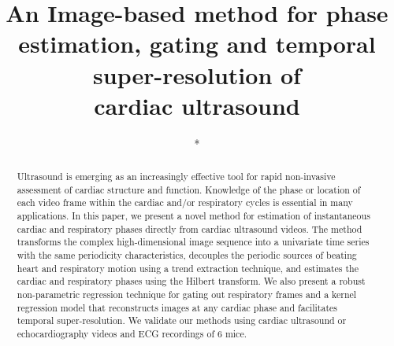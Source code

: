 \documentclass[runningheads,a4paper]{llncs}
\begin{document}
\mainmatter  %

\title{An Image-based method for phase estimation, gating and temporal super-resolution of \\cardiac ultrasound}


%
%

\author{*}
\authorrunning{*}   
\tocauthor{*}
\institute{*}

\maketitle

\begin{abstract}
Ultrasound is emerging as an increasingly effective tool for rapid non-invasive assessment of cardiac structure and function. Knowledge of the phase or location of each video frame within the cardiac and/or respiratory cycles is essential in many applications. In this paper, we present a novel method for estimation of instantaneous cardiac and respiratory phases directly from cardiac ultrasound videos. The method transforms the complex high-dimensional image sequence into a univariate time series with the same periodicity characteristics, decouples the periodic sources of beating heart and respiratory motion using a trend extraction technique, and estimates the cardiac and respiratory phases using the Hilbert transform. We also present a robust non-parametric regression technique for gating out respiratory frames and a kernel regression model that reconstructs images at any cardiac phase and facilitates temporal super-resolution. We validate our methods using cardiac ultrasound or echocardiography videos and ECG recordings of 6 mice.
\vspace{-0.5cm}
\end{abstract}
%
\end{document}
